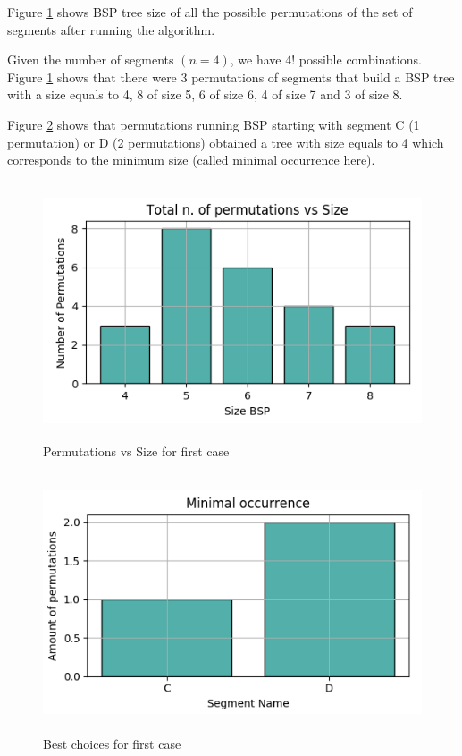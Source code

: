\documentclass{article}
\begin{document}
Figure \ref{fig:firstcasefig2} shows BSP tree size of all the possible permutations of the set of segments after running the algorithm.

Given the number of segments $(n=4)$, we have $4!$ possible combinations. Figure \ref{fig:firstcasefig2} shows that there were 3 permutations of segments that build a BSP tree with a size equals to 4, 8 of size 5, 6 of size 6, 4 of size 7 and 3 of size 8.

Figure \ref{fig:firstcasefig3} shows that permutations running BSP starting with segment C (1 permutation) or D (2 permutations) obtained a tree with size equals to 4 which corresponds to the minimum size (called minimal occurrence here).

\begin{figure}[H]
	\centering
	\includegraphics[height=3in]{Figure2.png}
	\caption {Permutations vs Size for first case}
	\label{fig:firstcasefig2}
\end{figure}

\begin{figure}[H]
	\centering
	\includegraphics[height=3in]{Figure3.png}
	\caption {Best choices for first case}
	\label{fig:firstcasefig3}
\end{figure}
\end{document}
